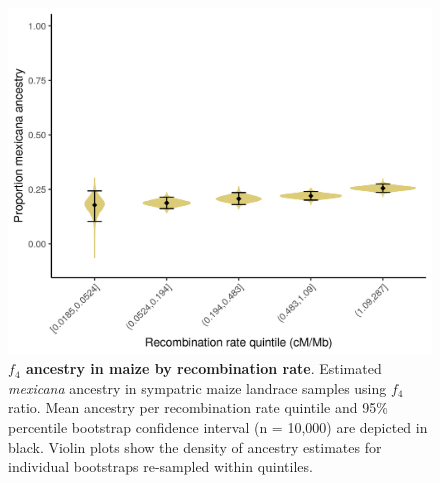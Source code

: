 \begin{figure}[ht]
\includegraphics[width=\textwidth]{chapter2/figures/f4_sympatric_maize_pop22_byr5.png}
\caption{\color{Gray} \textbf{$f_4$ ancestry in maize by recombination rate}. Estimated \textit{mexicana} ancestry in sympatric maize landrace samples using $f_4$ ratio. Mean ancestry per recombination rate quintile and 95\% percentile bootstrap confidence interval (n = 10,000) are depicted in black. Violin plots show the density of ancestry estimates for individual bootstraps re-sampled within quintiles.}
\label{f4_maize_by_r}
\end{figure}

